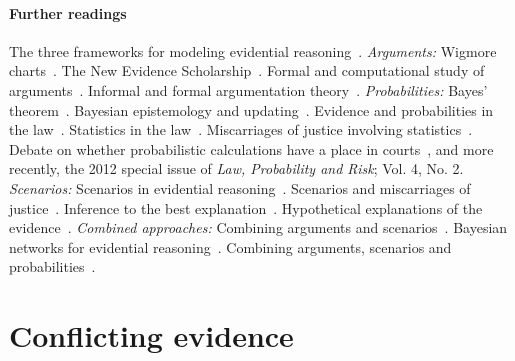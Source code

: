 \documentclass[10pt]{article}
\begin{document}

\paragraph{Further readings} 
The three frameworks for modeling evidential reasoning~\citep{andersonEtal2005,kapteinEtal2009,dawidEtal2011}. 
%
\textit{Arguments:} Wigmore charts~\citep{wigmore1913}. The New Evidence Scholarship~\citep{andersonEtal2005}. 
Formal and computational study of arguments~\citep{pollock1987,pollock1995}.
Informal and formal argumentation theory~\citep{vanEemerenEtal2014}.
%
\textit{Probabilities:}
Bayes' theorem~\citep{swinburne2002}. 
Bayesian epistemology and updating~\citep{bovensEtAl2003}. 
Evidence and probabilities in the law~\citep{dawid2002, schum1994,morteraDawid2007}.
Statistics in the law~\citep{fenton2011}. 
Miscarriages of justice involving statistics~\citep{dawidEtal2011,schnepsColmez2013}.
Debate on whether probabilistic calculations have a place in courts~\citep{finkelsteinFairley1970,tribe1971}, and more recently, 
the 2012 special issue of \textit{Law, Probability and Risk}; Vol. 4, No. 2. 
%
\textit{Scenarios:}
Scenarios in evidential reasoning~\citep{bennettFeldman1981,penningtonHastie1993,penningtonHastie1993StoryModel}. Scenarios and miscarriages of justice~\citep{wagenaarEtal1993}. Inference to the best explanation~\citep{pardoAllen2008}. Hypothetical explanations of the evidence~\citep{thagard1989}. 
%
\textit{Combined approaches:}
Combining arguments and scenarios~\citep{bexEtal2010,bex2011}. 
Bayesian networks for evidential reasoning~\citep{heplerEtal2007,fentonNeilLagnado2013}. 
Combining arguments, scenarios and probabilities~\citep{vlekEtal2016,timmerEtAl2017, verheijEtal2016,verheij2014,verheij2017}. 

\section{Conflicting evidence}
\label{sec:conf}
 	
\end{document}
